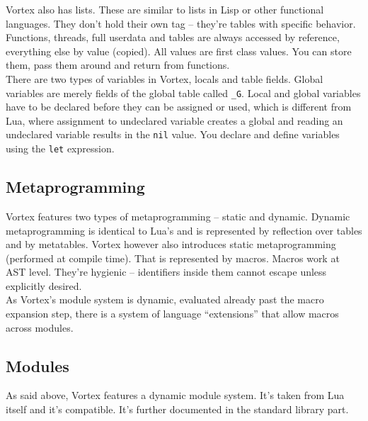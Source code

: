 \documentclass{article}
\begin{document}
Vortex also has lists. These are similar to lists in Lisp or other functional
languages. They don't hold their own tag -- they're tables with specific
behavior.\\
Functions, threads, full userdata and tables are always accessed by reference,
everything else by value (copied). All values are first class values. You can
store them, pass them around and return from functions.\\
There are two types of variables in Vortex, locals and table fields. Global
variables are merely fields of the global table called \verb|_G|. Local and
global variables have to be declared before they can be assigned or used,
which is different from Lua, where assignment to undeclared variable creates
a global and reading an undeclared variable results in the \verb|nil| value.
You declare and define variables using the \verb|let| expression.
\subsection{Metaprogramming}
Vortex features two types of metaprogramming -- static and dynamic. Dynamic
metaprogramming is identical to Lua's and is represented by reflection over
tables and by metatables. Vortex however also introduces static metaprogramming
(performed at compile time). That is represented by macros. Macros work at
AST level. They're hygienic -- identifiers inside them cannot escape unless
explicitly desired.\\
As Vortex's module system is dynamic, evaluated already past the macro
expansion step, there is a system of language \enquote{extensions} that
allow macros across modules.
\subsection{Modules}
As said above, Vortex features a dynamic module system. It's taken from
Lua itself and it's compatible. It's further documented in the standard
library part.
\end{document}
